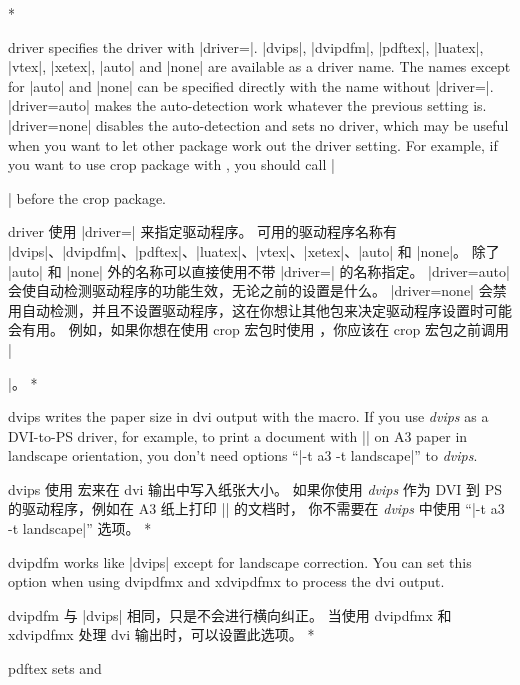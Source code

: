 \begin{Options}
\begin{paracol}{2}
\switchcolumn
\switchcolumn[0]*\item[\onlypre driver] specifies the driver with |driver=|. 
|dvips|, |dvipdfm|, |pdftex|, |luatex|, |vtex|, |xetex|, |auto| and |none| are
available as a driver name. The names except for |auto| and |none| can
be specified directly with the name without |driver=|.
|driver=auto| makes the auto-detection work whatever the previous setting is. 
|driver=none| disables the auto-detection and sets no driver, which
may be useful when you want to let other package work out the driver
setting. For example, if you want to use \textsf{crop} package with \Gm,
you should call |\usepackage[driver=none]{geometry}| before
the \textsf{crop} package.
\switchcolumn\item[\onlypre driver] 使用 |driver=| 来指定驱动程序。
可用的驱动程序名称有 |dvips|、|dvipdfm|、|pdftex|、|luatex|、|vtex|、|xetex|、|auto| 和 |none|。
除了 |auto| 和 |none| 外的名称可以直接使用不带 |driver=| 的名称指定。
|driver=auto| 会使自动检测驱动程序的功能生效，无论之前的设置是什么。
|driver=none| 会禁用自动检测，并且不设置驱动程序，这在你想让其他包来决定驱动程序设置时可能会有用。
例如，如果你想在使用 \textsf{crop} 宏包时使用 \Gm{}，你应该在 \textsf{crop} 宏包之前调用 |\usepackage[driver=none]{geometry}|。
\switchcolumn[0]*\item[\onlypre dvips] writes the paper size in dvi output with the 
    macro. If you use \textsl{dvips} as a DVI-to-PS driver,
    for example, to print a document with |\geometry{a3paper,landscape}|
    on A3 paper in landscape orientation, you don't need options
    ``|-t a3 -t landscape|'' to \textsl{dvips}. 
\switchcolumn\item[\onlypre dvips] 使用  宏来在 dvi 输出中写入纸张大小。
如果你使用 \textsl{dvips} 作为 DVI 到 PS 的驱动程序，例如在 A3 纸上打印 |\geometry{a3paper,landscape}| 的文档时，
你不需要在 \textsl{dvips} 中使用 ``|-t a3 -t landscape|'' 选项。
\switchcolumn[0]*\item[\onlypre dvipdfm] works like |dvips| except for landscape correction.
     You can set this option when using \textsf{dvipdfmx} and
     \textsf{xdvipdfmx} to process the dvi output.
\switchcolumn\item[\onlypre dvipdfm] 与 |dvips| 相同，只是不会进行横向纠正。
当使用 \textsf{dvipdfmx} 和 \textsf{xdvipdfmx} 处理 dvi 输出时，可以设置此选项。
\switchcolumn[0]*\item[\onlypre pdftex] sets  and 

\end{paracol}
\end{Options}
